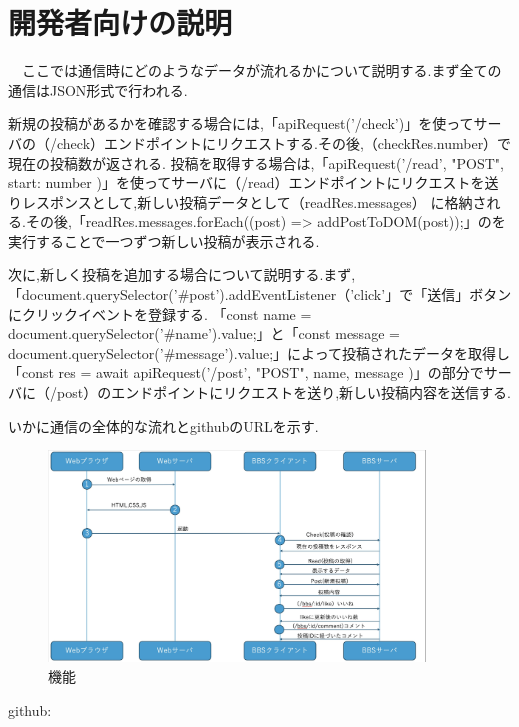 \documentclass{jsarticle}
\begin{document}
\section{開発者向けの説明}
　ここでは通信時にどのようなデータが流れるかについて説明する.まず全ての通信はJSON形式で行われる.\par
新規の投稿があるかを確認する場合には,「apiRequest('/check')」を使ってサーバの（/check）エンドポイントにリクエストする.その後,（checkRes.number）で現在の投稿数が返される.
投稿を取得する場合は,「apiRequest('/read', "POST", { start: number })」を使ってサーバに（/read）エンドポイントにリクエストを送りレスポンスとして,新しい投稿データとして（readRes.messages）
に格納される.その後,「readRes.messages.forEach((post) => addPostToDOM(post));」のを実行することで一つずつ新しい投稿が表示される.\par
次に,新しく投稿を追加する場合について説明する.まず,「document.querySelector('#post').addEventListener（'click'」で「送信」ボタンにクリックイベントを登録する.
「const name = document.querySelector('#name').value;」と「const message = document.querySelector('#message').value;」によって投稿されたデータを取得し
「const res = await apiRequest('/post', "POST", { name, message })」の部分でサーバに（/post）のエンドポイントにリクエストを送り,新しい投稿内容を送信する.\par
いかに通信の全体的な流れとgithubのURLを示す.\par

\begin{figure}[H]
    \centering
    \includegraphics[width=10cm]{fig/zu.jpeg}
    \caption{機能}
    \label{photoreflector_characteristic}
\end{figure}

\par
github:　
\end{document}
